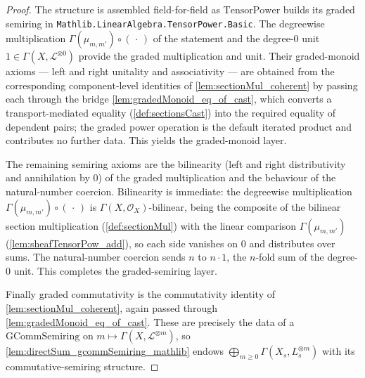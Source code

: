 \begin{proof}
  The structure is assembled field-for-field as \(\mathrm{TensorPower}\) builds its
  graded semiring in \texttt{Mathlib.LinearAlgebra.TensorPower.Basic}. The
  degreewise multiplication \(\Gamma(\mu_{m,m'}) \circ (\,\cdot\,)\) of the
  statement and the degree-\(0\) unit \(1 \in \Gamma(X, \mathcal{L}^{\otimes 0})\)
  provide the graded multiplication and unit. Their graded-monoid axioms --- left
  and right unitality and associativity --- are obtained from the corresponding
  component-level identities of \cref{lem:sectionMul_coherent} by passing each
  through the bridge \cref{lem:gradedMonoid_eq_of_cast}, which converts a
  transport-mediated equality (\cref{def:sectionsCast}) into the required equality
  of dependent pairs; the graded power operation is the default iterated product
  and contributes no further data. This yields the graded-monoid layer.

  The remaining semiring axioms are the bilinearity (left and right distributivity
  and annihilation by \(0\)) of the graded multiplication and the behaviour of the
  natural-number coercion. Bilinearity is immediate: the degreewise multiplication
  \(\Gamma(\mu_{m,m'}) \circ (\,\cdot\,)\) is \(\Gamma(X,\mathcal{O}_X)\)-bilinear,
  being the composite of the bilinear section multiplication (\cref{def:sectionMul})
  with the linear comparison \(\Gamma(\mu_{m,m'})\)
  (\cref{lem:sheafTensorPow_add}), so each side vanishes on \(0\) and distributes
  over sums. The natural-number coercion sends \(n\) to \(n \cdot 1\), the
  \(n\)-fold sum of the degree-\(0\) unit. This completes the graded-semiring
  layer.

  Finally graded commutativity is the commutativity identity of
  \cref{lem:sectionMul_coherent}, again passed through
  \cref{lem:gradedMonoid_eq_of_cast}. These are precisely the data of a
  \(\mathrm{GCommSemiring}\) on \(m \mapsto \Gamma(X, \mathcal{L}^{\otimes m})\),
  so \cref{lem:directSum_gcommSemiring_mathlib} endows
  \(\bigoplus_{m \ge 0} \Gamma(X_s, L_s^{\otimes m})\) with its commutative-semiring
  structure.
\end{proof}

